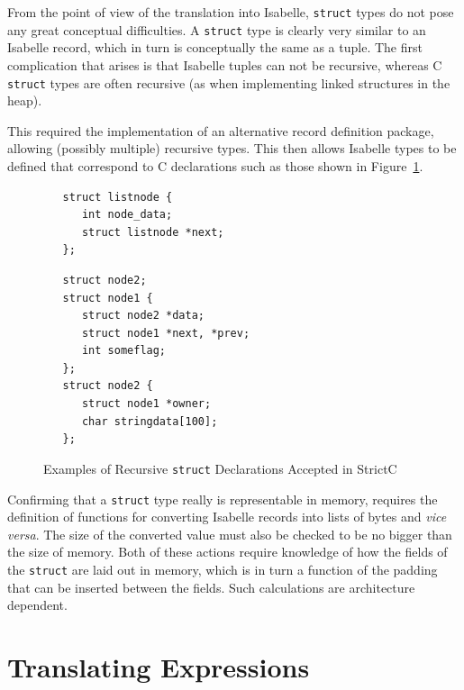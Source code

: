 \documentclass{article}
\newcommand{\strictc}{\textsf{StrictC}}
\begin{document}
From the point of view of the translation into Isabelle,
\texttt{struct} types do not pose any great conceptual difficulties.
A \texttt{struct} type is clearly very similar to an Isabelle record,
which in turn is conceptually the same as a tuple.  The first
complication that arises is that Isabelle tuples can not be recursive,
whereas C \texttt{struct} types are often recursive (as when
implementing linked structures in the heap).

This required the implementation of an alternative record definition
package, allowing (possibly multiple) recursive types.  This then
allows Isabelle types to be defined that correspond to C declarations
such as those shown in Figure~\ref{fig:struct-examples}.

\begin{figure}
\begin{minipage}[t]{0.4\textwidth}
\begin{verbatim}
   struct listnode {
      int node_data;
      struct listnode *next;
   };
\end{verbatim}
\end{minipage}
\qquad\quad
\begin{minipage}[t]{0.4\textwidth}
\begin{verbatim}
   struct node2;
   struct node1 {
      struct node2 *data;
      struct node1 *next, *prev;
      int someflag;
   };
   struct node2 {
      struct node1 *owner;
      char stringdata[100];
   };
\end{verbatim}
\end{minipage}
\caption{Examples of Recursive \texttt{struct} Declarations Accepted
  in \strictc}
\label{fig:struct-examples}
\end{figure}

Confirming that a \texttt{struct} type really is representable in
memory, requires the definition of functions for converting Isabelle
records into lists of bytes and \emph{vice versa}.  The size of the
converted value must also be checked to be no bigger than the size of
memory.  Both of these actions require knowledge of how the fields of
the \texttt{struct} are laid out in memory, which is in turn a
function of the padding that can be inserted between the fields.  Such
calculations are architecture dependent.


\section{Translating Expressions}
\label{sec:expressions}
\end{document}
